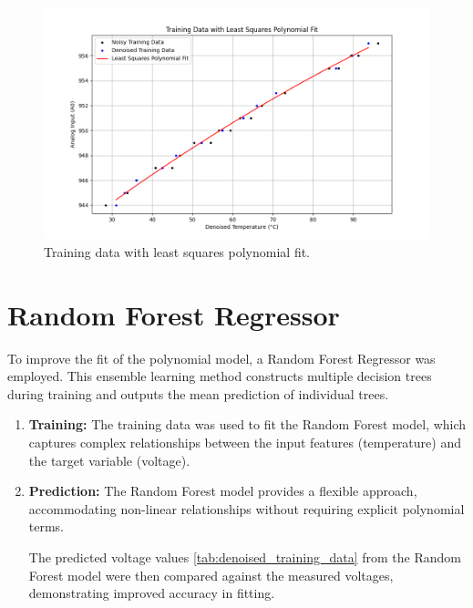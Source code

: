 \documentclass[journal,onecolumn]{IEEEtran}
\begin{document}
	\begin{figure}[h]
		\centering
		\includegraphics[width=1\textwidth]{figs/train_fit.png}
		\caption{Training data with least squares polynomial fit.}
		\label{fig:train_fit}
	\end{figure}
	
	\section{Random Forest Regressor}
	To improve the fit of the polynomial model, a Random Forest Regressor was employed. This ensemble learning method constructs multiple decision trees during training and outputs the mean prediction of individual trees.
	
	\begin{enumerate}
		\item \textbf{Training:} The training data was used to fit the Random Forest model, which captures complex relationships between the input features (temperature) and the target variable (voltage).
		
		\item \textbf{Prediction:} The Random Forest model provides a flexible approach, accommodating non-linear relationships without requiring explicit polynomial terms.
		
		The predicted voltage values \ref{tab:denoised_training_data} from the Random Forest model were then compared against the measured voltages, demonstrating improved accuracy in fitting.
	\end{enumerate}
\end{document}
